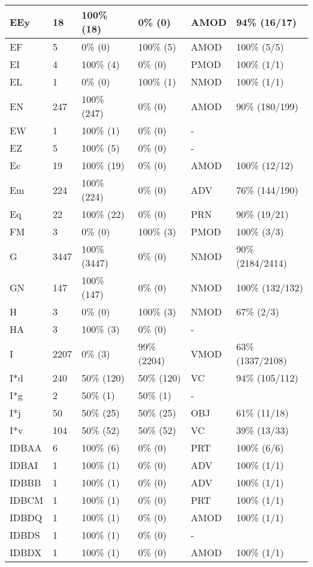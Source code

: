 \begin{figure*}
\begin{tabular}{|l|l|l|l||l|l|}
\hline
 EEy & 18 & 100\% (18) & 0\% (0) & AMOD & 94\% (16/17) \\ 
\hline
 EF & 5 & 0\% (0) & 100\% (5) & AMOD & 100\% (5/5) \\ 
\hline
 EI & 4 & 100\% (4) & 0\% (0) & PMOD & 100\% (1/1) \\ 
\hline
 EL & 1 & 0\% (0) & 100\% (1) & NMOD & 100\% (1/1) \\ 
\hline
 EN & 247 & 100\% (247) & 0\% (0) & AMOD & 90\% (180/199) \\ 
\hline
 EW & 1 & 100\% (1) & 0\% (0) & - &  \\ 
\hline
 EZ & 5 & 100\% (5) & 0\% (0) & - &  \\ 
\hline
 Ec & 19 & 100\% (19) & 0\% (0) & AMOD & 100\% (12/12) \\ 
\hline
 Em & 224 & 100\% (224) & 0\% (0) & ADV & 76\% (144/190) \\ 
\hline
 Eq & 22 & 100\% (22) & 0\% (0) & PRN & 90\% (19/21) \\ 
\hline
 FM & 3 & 0\% (0) & 100\% (3) & PMOD & 100\% (3/3) \\ 
\hline
 G & 3447 & 100\% (3447) & 0\% (0) & NMOD & 90\% (2184/2414) \\ 
\hline
 GN & 147 & 100\% (147) & 0\% (0) & NMOD & 100\% (132/132) \\ 
\hline
 H & 3 & 0\% (0) & 100\% (3) & NMOD & 67\% (2/3) \\ 
\hline
 HA & 3 & 100\% (3) & 0\% (0) & - &  \\ 
\hline
 I & 2207 & 0\% (3) & 99\% (2204) & VMOD & 63\% (1337/2108) \\ 
\hline
 I*d & 240 & 50\% (120) & 50\% (120) & VC & 94\% (105/112) \\ 
\hline
 I*g & 2 & 50\% (1) & 50\% (1) & - &  \\ 
\hline
 I*j & 50 & 50\% (25) & 50\% (25) & OBJ & 61\% (11/18) \\ 
\hline
 I*v & 104 & 50\% (52) & 50\% (52) & VC & 39\% (13/33) \\ 
\hline
 IDBAA & 6 & 100\% (6) & 0\% (0) & PRT & 100\% (6/6) \\ 
\hline
 IDBAI & 1 & 100\% (1) & 0\% (0) & ADV & 100\% (1/1) \\ 
\hline
 IDBBB & 1 & 100\% (1) & 0\% (0) & ADV & 100\% (1/1) \\ 
\hline
 IDBCM & 1 & 100\% (1) & 0\% (0) & PRT & 100\% (1/1) \\ 
\hline
 IDBDQ & 1 & 100\% (1) & 0\% (0) & AMOD & 100\% (1/1) \\ 
\hline
 IDBDS & 1 & 100\% (1) & 0\% (0) & - &  \\ 
\hline
 IDBDX & 1 & 100\% (1) & 0\% (0) & AMOD & 100\% (1/1) \\ 
\hline
\end{tabular}
\end{figure*}
